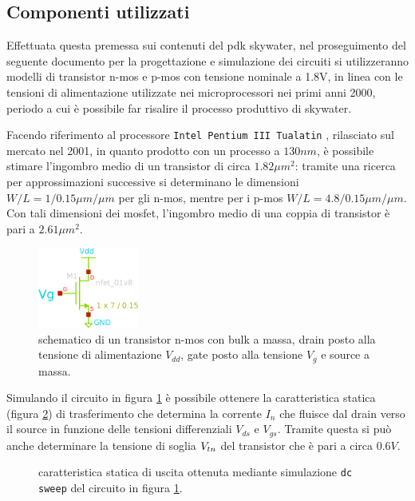 	\subsection*{Componenti utilizzati}
		Effettuata questa premessa sui contenuti del pdk skywater, nel proseguimento del seguente documento per la progettazione e simulazione dei circuiti si utilizzeranno modelli di transistor n-mos e p-mos con tensione nominale a 1.8V, in linea con le tensioni di alimentazione utilizzate nei microprocessori nei primi anni 2000, periodo a cui è possibile far risalire il processo produttivo di skywater. 
		
		Facendo riferimento al processore \texttt{Intel Pentium III Tualatin} \cite{tualatin}, rilasciato sul mercato nel 2001, in quanto prodotto con un processo a $130nm$, è possibile stimare l'ingombro medio di un transistor di circa $1.82 \mu m^2$: tramite una ricerca per approssimazioni successive si determinano le dimensioni $W/L = 1/0.15 \mu m/\mu m$ per gli n-mos, mentre per i p-mos $W/L = 4.8/0.15 \mu m/\mu m$. Con tali dimensioni dei mosfet, l'ingombro medio di una coppia di transistor è pari a $2.61 \mu m^2$.
		
		\begin{figure}[bht]
			\centering
			\includegraphics[width=3.3cm]{Immagini/nmos.eps}
			\caption{schematico di un transistor n-mos con bulk a massa, drain posto alla tensione di alimentazione $V_{dd}$, gate posto alla tensione $V_g$ e source a massa.} \label{fig:intro:schematico-nmos}
		\end{figure}
	
		Simulando il circuito in figura \ref{fig:intro:schematico-nmos} è possibile ottenere la caratteristica statica (figura \ref{fig:intro:nmos-carattstatica}) di trasferimento che determina la corrente $I_n$ che fluisce dal drain verso il source in funzione delle tensioni differenziali $V_{ds}$ e $V_{gs}$. Tramite questa si può anche determinare la tensione di soglia $V_{tn}$ del transistor che è pari a circa $0.6V$.
		
		\begin{figure}[H]
			\centering
			
			\caption{caratteristica statica di uscita ottenuta mediante simulazione \texttt{dc sweep} del circuito in figura \ref{fig:intro:schematico-nmos}.}
			\label{fig:intro:nmos-carattstatica}
		\end{figure}
		
